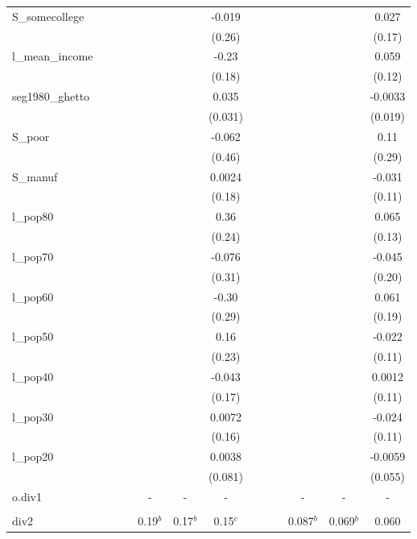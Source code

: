 \documentclass[]{article}
\begin{document}
\begin{tabular}{lcccccccccccc}
S\_somecollege &  &  &  &  &  & -0.019 &  &  &  &  &  & 0.027 \\
 &  &  &  &  &  & (0.26) &  &  &  &  &  & (0.17) \\
l\_mean\_income &  &  &  &  &  & -0.23 &  &  &  &  &  & 0.059 \\
 &  &  &  &  &  & (0.18) &  &  &  &  &  & (0.12) \\
seg1980\_ghetto &  &  &  &  &  & 0.035 &  &  &  &  &  & -0.0033 \\
 &  &  &  &  &  & (0.031) &  &  &  &  &  & (0.019) \\
S\_poor &  &  &  &  &  & -0.062 &  &  &  &  &  & 0.11 \\
 &  &  &  &  &  & (0.46) &  &  &  &  &  & (0.29) \\
S\_manuf &  &  &  &  &  & 0.0024 &  &  &  &  &  & -0.031 \\
 &  &  &  &  &  & (0.18) &  &  &  &  &  & (0.11) \\
l\_pop80 &  &  &  &  &  & 0.36 &  &  &  &  &  & 0.065 \\
 &  &  &  &  &  & (0.24) &  &  &  &  &  & (0.13) \\
l\_pop70 &  &  &  &  &  & -0.076 &  &  &  &  &  & -0.045 \\
 &  &  &  &  &  & (0.31) &  &  &  &  &  & (0.20) \\
l\_pop60 &  &  &  &  &  & -0.30 &  &  &  &  &  & 0.061 \\
 &  &  &  &  &  & (0.29) &  &  &  &  &  & (0.19) \\
l\_pop50 &  &  &  &  &  & 0.16 &  &  &  &  &  & -0.022 \\
 &  &  &  &  &  & (0.23) &  &  &  &  &  & (0.11) \\
l\_pop40 &  &  &  &  &  & -0.043 &  &  &  &  &  & 0.0012 \\
 &  &  &  &  &  & (0.17) &  &  &  &  &  & (0.11) \\
l\_pop30 &  &  &  &  &  & 0.0072 &  &  &  &  &  & -0.024 \\
 &  &  &  &  &  & (0.16) &  &  &  &  &  & (0.11) \\
l\_pop20 &  &  &  &  &  & 0.0038 &  &  &  &  &  & -0.0059 \\
 &  &  &  &  &  & (0.081) &  &  &  &  &  & (0.055) \\
o.div1 &  &  &  & - & - & - &  &  &  & - & - & - \\
 &  &  &  &  &  &  &  &  &  &  &  &  \\
div2 &  &  &  & 0.19$^b$ & 0.17$^b$ & 0.15$^c$ &  &  &  & 0.087$^b$ & 0.069$^b$ & 0.060 \\

\end{tabular}
\end{document}
